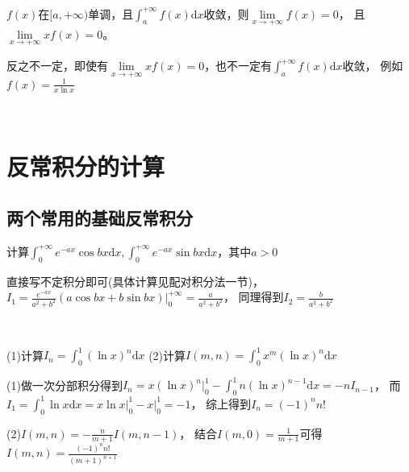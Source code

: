 ~

\begin{exercise}[单调]
  $f(x)$在$[a,+\infty)$单调，且$\int_a^{+\infty}f(x)\mathrm{d} x$收敛，则$\lim \limits _{x \rightarrow +\infty}f(x) = 0 $，
  且$\lim \limits _{x \rightarrow +\infty}xf(x) = 0$。
\end{exercise}

\begin{note}
  反之不一定，即使有$\lim \limits _{x \rightarrow +\infty}xf(x) = 0$，也不一定有$\int_a^{+\infty}f(x)\mathrm{d} x$收敛，
  例如$f(x) = \frac{1}{x \ln x}$
\end{note}

~

\section{反常积分的计算}

\subsection{两个常用的基础反常积分}


\begin{exercise}
  计算$\int_0^{+\infty} e^{-ax}\cos bx \mathrm{d} x, \int_0^{+\infty} e^{-ax} \sin bx \mathrm{d} x$，其中$a > 0$
\end{exercise}

\begin{solution}
  直接写不定积分即可(具体计算见配对积分法一节)，
  $I_1 = \frac{e^{-ax}}{a^2 + b^2} (a \cos bx + b \sin bx) \bigg|_0^{+\infty} = \frac{a}{a^2+b^2}$，
  同理得到$I_2 = \frac{b}{a^2 + b^2}$
\end{solution}

~

\begin{exercise}[对数配对积分]
  (1)计算$I_n = \int_0^1 (\ln x)^n \mathrm{d} x$
  (2)计算$I(m,n) = \int_0^1 x^m (\ln x)^n \mathrm{d} x$
\end{exercise}

\begin{solution}
  (1)做一次分部积分得到$I_n = x (\ln x)^n \bigg|_0^1 - \int_0^1 n (\ln x)^{n-1}\mathrm{d}x = -n I_{n-1}$，
  而$I_1 = \int_0^1 \ln x \mathrm{d} x = x \ln x \bigg|_0^1 - x \bigg|_0^1 = -1$，
  综上得到$I_n = (-1)^nn!$

  (2)$I(m,n) = - \frac{n}{m+1}I(m,n-1)$，
  结合$I(m,0) = \frac{1}{m+1}$可得$I(m,n) = \frac{(-1)^nn!}{(m+1)^{n+1}}$
\end{solution}

